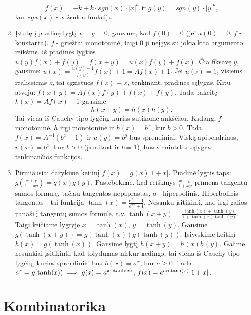 \begin{enumerate}
    $$f(x)=-k+k\cdot sgn(x)\cdot |x|^a \text{ ir } g(y)=sgn(y)\cdot |y|^a,$$
    kur $sgn(x)$ - $x$ ženklo funkcija.
\item
    Įstatę į pradinę lygtį $x=y=0$, gausime, kad $f(0)=0$ (jei $u(0)=0$,
    $f$ - konstanta). $f$ - griežtai monotoninė, taigi $0$ ji neįgys su
    jokia kita argumento reikšme. Iš pradinės lygties
    $u(y)f(x)+f(y)=f(x+y)=u(x)f(y)+f(x)$. Čia fiksavę $y$, gausime:
    $u(x)=\frac{u(y)-1}{f(y)}f(x)+1=Af(x)+1$. Jei $u(z)=1$, visiems
    realiesiems $z$, tai egzistuos $f(x)=x$, tenkinanti pradines sąlygas.
    Kitu atveju: $f(x+y)=Af(x)f(y)+f(x)+f(y)$. Tada pakeitę $h(x)=Af(x)+1$
    gausime $$h(x+y)=h(x)h(y).$$ Tai viena iš Cauchy tipo lygčių, kurias
    sutikome ankščiau. Kadangi $f$ monotoninė, $h$ irgi monotoninė ir
    $h(x)=b^x$, kur $b>0$. Tada $f(x)=A^{-1}(b^x-1)$ ir $u(y)=b^y$ bus
    sprendiniai. Viską apibendrinus, $u(x)=b^x$, kur $b>0$ (įskaitant ir
    $b=1$), bus vienintelės sąlygas tenkinančios funkcijos.
\item
    Pirmiausiai darykime keitinį $f(x)=g(x)|1+x|$. Pradinė lygtis taps:
    $g(\frac{x+y}{1+xy})=g(x)g(y)$. Pastebėkime, kad reiškinys
    $\frac{x+y}{1+xy}$ primena tangentų sumos formulę, tačiau tangentas
    nepaprastas, o - hiperbolinis. Hiperbolinis tangentas - tai funkcija
    $\tanh (x)=\frac{e^{2x}-1}{e^{2x}+1}$. Nesunku įsitikinti, kad irgi
    galios panaši į tangentų sumos formulė, t.y. $\tanh(x+y)=\frac{\tanh
    (x)+\tanh (y)}{1+\tanh (x) \tanh (y)}$. Taigi keičiame lygtyje
    $x=\tanh(x)$, $y=\tanh(y)$. Gausime $g(\tanh(x+y))=g(\tanh(x))g(\tanh(y))$.
    Įsiveskime keitinį $h(x)=g(\tanh(x))$. Gausime lygtį $h(x+y)=h(x)h(y)$.
    Galime nesunkiai įsitikinti, kad tolydumas niekur nedingo, tai viena
    iš Cauchy tipo lygčių, kurios sprendiniai bus $h(x)=a^{x}$, kur $a\geq
    0$. Tada $a^{x}=g(\tanh(x))\implies g(x)=a^{\operatorname{arctanh}(x)}$,
    $f(x)=a^{\operatorname{arctanh}(x)}|1+x|$.
\end{enumerate} 
\section*{Kombinatorika}
